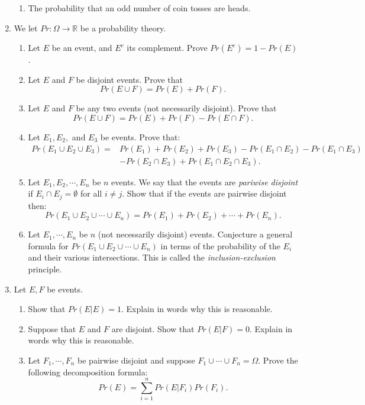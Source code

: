 \documentclass[11pt]{article}
\newcommand{\bR}{\mathbb{R}}
\begin{document}
\begin{enumerate}
{\begin{enumerate}
{    }
    \item{
    The probability that an odd number of coin tosses are heads.
    }
  \end{enumerate}
  }
  \item{We let $Pr:\Omega\to\bR$ be a probability theory.
  \begin{enumerate}
    \item{
    Let $E$ be an event, and $E^c$ its complement.  Prove $Pr(E^c) = 1- Pr(E)$.
    }
    \item{
    Let $E$ and $F$ be disjoint events.  Prove that
    \[Pr(E\cup F) = Pr(E) + Pr(F).\]
    }
    \item{
    Let $E$ and $F$ be any two events (not necessarily disjoint).  Prove that
    \[Pr(E\cup F) = Pr(E) + Pr(F) - Pr(E\cap F).\]
    }
    \item{
    Let $E_1,E_2,$ and $E_3$ be events.  Prove that:
    \begin{eqnarray*}Pr(E_1\cup E_2\cup E_3) = &Pr(E_1) + Pr(E_2) + Pr(E_3) - Pr(E_1\cap E_2) - Pr(E_1\cap E_3)\\&- Pr(E_2\cap E_3) + Pr(E_1\cap E_2\cap E_3).
    \end{eqnarray*}
    }
    \item{
    Let $E_1,E_2,\cdots,E_n$ be $n$ events.  We say that the events are \textit{pariwise disjoint} if $E_i\cap E_j=\emptyset$ for all $i\not=j$.  Show that if the events are pairwise disjoint then:
    \[Pr(E_1\cup E_2\cup\cdots\cup E_n) = Pr(E_1)+Pr(E_2)+\cdots+Pr(E_n).\]
    }
    \item{
    Let $E_1,\cdots,E_n$ be $n$ (not necessarily disjoint) events.  Conjecture a general formula for $Pr(E_1\cup E_2\cup\cdots\cup E_n)$ in terms of the probability of the $E_i$ and their various intersections.  This is called the \textit{inclusion-exclusion} principle.
    }
  \end{enumerate}
  }
  \item{
  Let $E,F$ be events.
  \begin{enumerate}
    \item{
    Show that $Pr(E|E)=1$.  Explain in words why this is reasonable.
    }
    \item{
    Suppose that $E$ and $F$ are disjoint.  Show that $Pr(E|F) = 0$.  Explain in words why this is reasonable.
    }
    \item{
    Let $F_1,\cdots,F_n$ be pairwise disjoint and suppose $F_1\cup\cdots\cup F_n = \Omega$.  Prove the following decomposition formula:
    \[Pr(E) = \sum_{i=1}^n Pr(E|F_i)Pr(F_i).\]
}
\end{enumerate}}
\end{enumerate}
\end{document}
